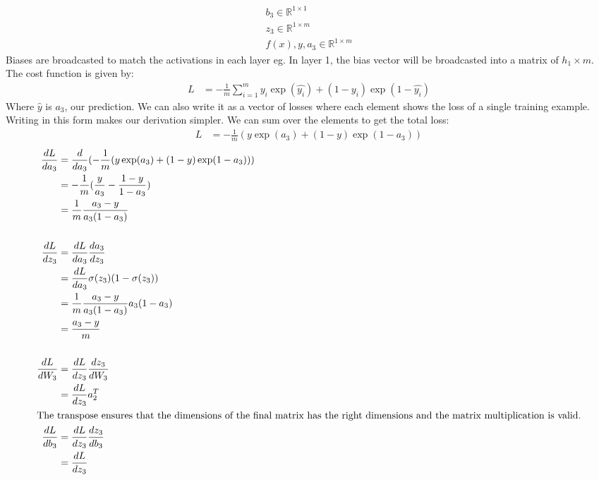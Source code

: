 \documentclass{article}
\begin{document}
\begin{enumerate}
\begin{enumerate}
\begin{align*}
            b_3 \in\mathbb{R}^{1 \times 1}\\
            z_3 \in\mathbb{R}^{1 \times m}\\
            f(x), y, a_3 \in\mathbb{R}^{1 \times m}
        \end{align*}
        Biases are broadcasted to match the activations in each layer eg. In layer 1, the bias vector will be broadcasted into a matrix of $h_1\times m$.
        \newpage
        The cost function is given by:
        \begin{align*}
            L &= -\frac{1}{m} \sum_{i=1}^{m} y_i\exp(\hat{y_i}) + (1-y_i)\exp(1-\hat{y_i})
        \end{align*}
        Where $\hat{y}$ is $a_3$, our prediction. We can also write it as a vector of losses where each element shows the loss of a single training example. Writing in this form makes our derivation simpler. We can sum over the elements to get the total loss:
        \begin{align*}
            L &= -\frac{1}{m}(y\exp(a_3) + (1-y)\exp(1-a_3))
        \end{align*}
        \begin{align*}
            \frac{d L}{d a_3} &= \frac{d}{d a_3}(-\frac{1}{m}(y\exp(a_3) + (1-y)\exp(1-a_3)))\\
            &= -\frac{1}{m} (\frac{y}{a_3} - \frac{1-y}{1-a_3})\\
            &= \frac{1}{m} \frac{a_3 - y}{a_3(1-a_3)}\\
            \\
             \frac{d L}{d z_3} &= \frac{d L}{d a_3}\frac{d a_3}{d z_3}\\
             &= \frac{d L}{d a_3} \sigma(z_3)(1 - \sigma(z_3)) \\
             &= \frac{1}{m} \frac{a_3 - y}{a_3(1-a_3)} a_3(1-a_3)\\
             &= \frac{a_3 - y}{m}\\
             \\
             \frac{d L}{d W_3} &= \frac{d L}{d z_3} \frac{d z_3}{d W_3}\\
             &= \frac{d L}{d z_3} a_2^{T}\\
             \intertext{The transpose ensures that the dimensions of the final matrix has the right dimensions and the matrix multiplication is valid.}
            \frac{d L}{d b_3} &= \frac{d L}{d z_3} \frac{d z_3}{d b_3}\\
                &= \frac{d L}{d z_3}\\

\end{align*}
\end{enumerate}
\end{enumerate}
\end{document}
